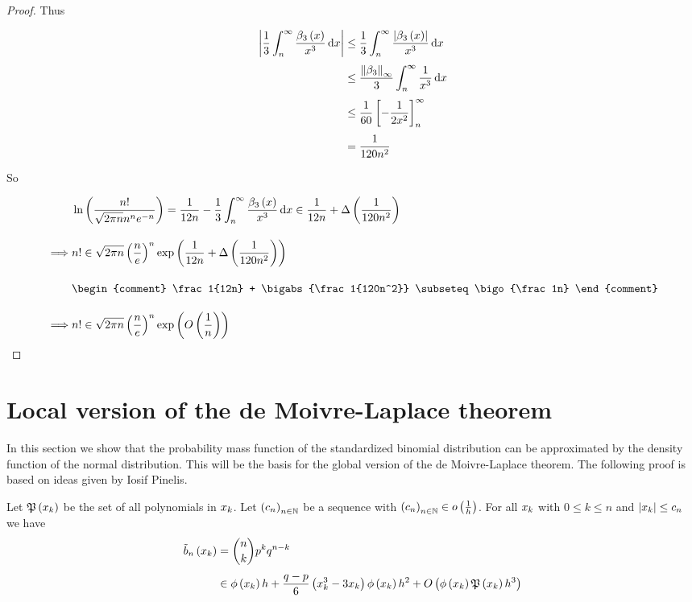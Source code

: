 \begin{proof}
  \noindent Thus

  \begin{align}
    \abs{\frac 13\int_n^\infty \frac{\bp[3]{x}}{x^3} \d{x}} & \le \frac 13 \int_n^\infty \frac{\abs{\bp[3]{x}}}{x^3} \d{x} \nl
    & \le \frac{\snorm{\bps[3]}}{3} \int_n^\infty \frac 1{x^3} \d{x} \nl
    & \le \frac{1}{60} \left[-\frac{1}{2x^2}\right]_n^\infty \nl
    & = \frac 1{120n^2}
  \end{align}

  \noindent So

  \begin{align}
    & \ln\left(\frac{n!}{\sqrt{2\pi n}n^n e^{-n}}\right) = \frac 1{12n} - \frac 13 \int_n^\infty \frac{\bp[3]{x}}{x^3} \d{x} \in \frac 1{12n} + \bigabs{\frac{1}{120n^2}} \bnl
    \implies & n! \in \sqrt{2\pi n} \left(\frac ne\right)^n \fexp{\frac 1{12n} + \bigabs{\frac 1{120n^2}}} \bnl
    &
    \begin{comment}
      \frac 1{12n} + \bigabs{\frac 1{120n^2}} \subseteq \bigo{\frac 1n}
    \end{comment} \bnl
    \implies & n! \in \sqrt{2\pi n} \left(\frac ne\right)^n \fexp{\bigo{\frac 1n}}
  \end{align}
\end{proof}

\section{Local version of the de Moivre-Laplace theorem}

In this section we show that the probability mass function of the standardized binomial distribution can be approximated by the density function of the normal distribution. This will be the basis for the global version of the de Moivre-Laplace theorem. The following proof is based on ideas given by Iosif Pinelis\cite{iosif}.

\newcommand*{\Ro}[1]{R_1\left({#1}\right)}
\newcommand*{\Rt}[1]{R_2\left({#1}\right)}

\begin{theorem}
  Let $\mathfrak P\left( {x_{k}} \right)$ be the set of all polynomials in $x_{k}$. Let $\left({c_n}\right)_{{n}\in\mathbb N}$ be a sequence with $\left({c_n}\right)_{{n}\in\mathbb N} \in o\left( {\frac 1h} \right)$. For all $x_{k}$ with $0\le k\le n$ and $\left|{x_k}\right| \le c_n$ we have
  \begin{align}
    \bb{x_k} &= \binom nk p^k q^{n-k} \nl
    &\in \fphi{\x} h +\frac{q-p}6 \left(\x^3-3\x\right) \fphi{\x} h^2 + \bigo{\fphi{\x}\pol{\x}h^3}
  \end{align}
\end{theorem}

